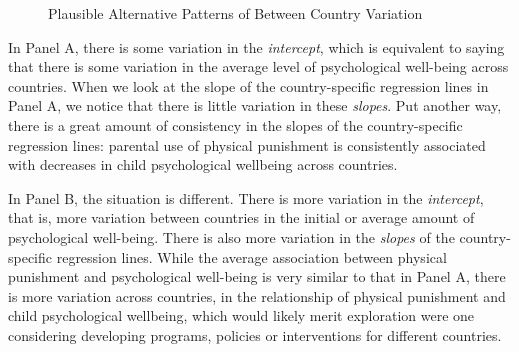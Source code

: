\documentclass[
  letterpaper,
  DIV=11,
  numbers=noendperiod]{scrreprt}
\begin{document}
\begin{figure}


\caption{\label{fig-variation1}Plausible Alternative Patterns of Between
Country Variation}

\end{figure}%

In Panel A, there is some variation in the \emph{intercept}, which is
equivalent to saying that there is some variation in the average level
of psychological well-being across countries. When we look at the slope
of the country-specific regression lines in Panel A, we notice that
there is little variation in these \emph{slopes}. Put another way, there
is a great amount of consistency in the slopes of the country-specific
regression lines: parental use of physical punishment is consistently
associated with decreases in child psychological wellbeing across
countries.

In Panel B, the situation is different. There is more variation in the
\emph{intercept}, that is, more variation between countries in the
initial or average amount of psychological well-being. There is also
more variation in the \emph{slopes} of the country-specific regression
lines. While the average association between physical punishment and
psychological well-being is very similar to that in Panel A, there is
more variation across countries, in the relationship of physical
punishment and child psychological wellbeing, which would likely merit
exploration were one considering developing programs, policies or
interventions for different countries.
\end{document}

